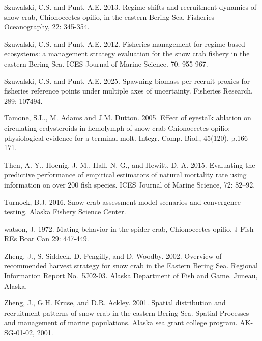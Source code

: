 \documentclass[
]{article}
\begin{document}
Szuwalski, C.S. and Punt, A.E. 2013. Regime shifts and recruitment dynamics of snow crab, Chionoecetes opilio, in the eastern Bering Sea. Fisheries Oceanography, 22: 345-354.

Szuwalski, C.S. and Punt, A.E. 2012. Fisheries management for regime-based ecosystems: a management strategy evaluation for the snow crab fishery in the eastern Bering Sea. ICES Journal of Marine Science. 70: 955-967.

Szuwalski, C.S. and Punt, A.E. 2025. Spawning-biomass-per-recruit proxies for fisheries reference points under multiple axes of uncertainty. Fisheries Research. 289: 107494.

Tamone, S.L., M. Adams and J.M. Dutton. 2005. Effect of eyestalk ablation on circulating ecdysteroids in hemolymph of snow crab Chionoecetes opilio: physiological evidence for a terminal molt. Integr. Comp. Biol., 45(120), p.166-171.

Then, A. Y., Hoenig, J. M., Hall, N. G., and Hewitt, D. A. 2015. Evaluating the predictive performance of empirical estimators of natural mortality rate using information on over 200 fish species. ICES Journal of Marine Science, 72: 82--92.

Turnock, B.J. 2016. Snow crab assessment model scenarios and convergence testing. Alaska Fishery Science Center.

watson, J. 1972. Mating behavior in the spider crab, Chionoecetes opilio. J Fish REs Boar Can 29: 447-449.

Zheng, J., S. Siddeek, D. Pengilly, and D. Woodby. 2002. Overview of recommended harvest strategy for snow crab in the Eastern Bering Sea. Regional Information Report No.~5J02-03. Alaska Department of Fish and Game. Juneau, Alaska.

Zheng, J., G.H. Kruse, and D.R. Ackley. 2001. Spatial distribution and recruitment patterns of snow crab in the eastern Bering Sea. Spatial Processes and management of marine populations. Alaska sea grant college program. AK-SG-01-02, 2001.
\end{document}
